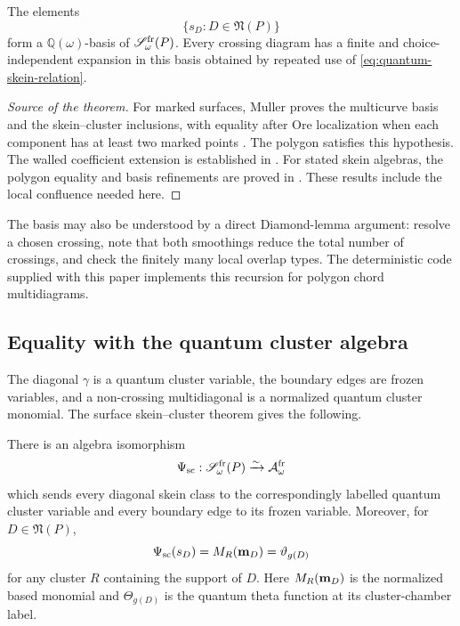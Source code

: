 \begin{theorem}
\label{thm:skein-basis}
The elements
\[
 \{s_D:D\in\mathfrak N(P)\}
\]
form a $\mathbb Q(\omega)$-basis of
$\mathscr S_\omega^{\rm fr}(P)$.  Every crossing diagram has a finite and
choice-independent expansion in this basis obtained by repeated use of
\eqref{eq:quantum-skein-relation}.
\end{theorem}

\begin{proof}[Source of the theorem]
For marked surfaces, Muller proves the multicurve basis and the skein--cluster
inclusions, with equality after Ore localization when each component has at
least two marked points \cite{Muller}.  The polygon satisfies this hypothesis.
The walled coefficient extension is established in
\cite{IshibashiKanoYuasa}.  For stated skein algebras, the polygon equality and
basis refinements are proved in \cite{CaoHuangWang}.  These results include the
local confluence needed here.
\end{proof}

The basis may also be understood by a direct Diamond-lemma argument: resolve a
chosen crossing, note that both smoothings reduce the total number of
crossings, and check the finitely many local overlap types.  The deterministic
code supplied with this paper implements this recursion for polygon chord
multidiagrams.

\subsection{Equality with the quantum cluster algebra}

The diagonal $\gamma$ is a quantum cluster variable, the boundary edges are
frozen variables, and a non-crossing multidiagonal is a normalized quantum
cluster monomial.  The surface skein--cluster theorem gives the following.

\begin{theorem}
\label{thm:skein-cluster}
There is an algebra isomorphism
\begin{equation}
 \Psi_{\rm sc}:
 \mathscr S_\omega^{\rm fr}(P)
 \xrightarrow{\sim}
 \mathcal A_{\omega}^{\mathrm{fr}}
 \label{eq:skein-cluster-isomorphism}
\end{equation}
which sends every diagonal skein class to the correspondingly labelled
quantum cluster variable and every boundary edge to its frozen variable.
Moreover, for $D\in\mathfrak N(P)$,
\begin{equation}
 \Psi_{\rm sc}(s_D)
 =M_R(\mathbf m_D)
 =\vartheta_{g(D)}
 \label{eq:noncrossing-theta}
\end{equation}
for any cluster $R$ containing the support of $D$.  Here $M_R(\mathbf m_D)$ is the
normalized based monomial and $\Theta_{g(D)}$ is the quantum theta function at
its cluster-chamber label.
\end{theorem}

